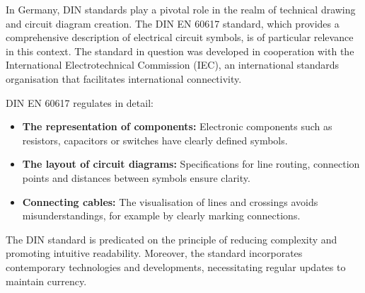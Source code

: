 In Germany, DIN standards play a pivotal role in the realm of technical drawing and circuit diagram creation. The DIN EN 60617 standard, which provides a comprehensive description of electrical circuit symbols, is of particular relevance in this context. The standard in question was developed in cooperation with the International Electrotechnical Commission (IEC), an international standards organisation that facilitates international connectivity.

DIN EN 60617 regulates in detail:

\begin{itemize}
\item \textbf{The representation of components:} Electronic components such as resistors, capacitors or switches have clearly defined symbols.
\item \textbf{The layout of circuit diagrams:} Specifications for line routing, connection points and distances between symbols ensure clarity.
\item \textbf{Connecting cables:} The visualisation of lines and crossings avoids misunderstandings, for example by clearly marking connections.
\end{itemize}
%
The DIN standard is predicated on the principle of reducing complexity and promoting intuitive readability. Moreover, the standard incorporates contemporary technologies and developments, necessitating regular updates to maintain currency.

